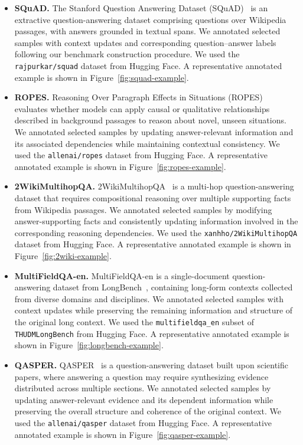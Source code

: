 \begin{itemize}

\item \textbf{SQuAD.}
The Stanford Question Answering Dataset (SQuAD)~\citep{rajpurkar2016squad} is an extractive question-answering dataset comprising questions over Wikipedia passages, with answers grounded in textual spans.
We annotated selected samples with context updates and corresponding question--answer labels following our benchmark construction procedure.
We used the \texttt{rajpurkar/squad} dataset from Hugging Face.
A representative annotated example is shown in Figure~\ref{fig:squad-example}.

\item \textbf{ROPES.}
Reasoning Over Paragraph Effects in Situations (ROPES)~\citep{lin2019reasoning} evaluates whether models can apply causal or qualitative relationships described in background passages to reason about novel, unseen situations.
We annotated selected samples by updating answer-relevant information and its associated dependencies while maintaining contextual consistency.
We used the \texttt{allenai/ropes} dataset from Hugging Face.
A representative annotated example is shown in Figure~\ref{fig:ropes-example}.

\item \textbf{2WikiMultihopQA.}
2WikiMultihopQA~\citep{ho2020constructing} is a multi-hop question-answering dataset that requires compositional reasoning over multiple supporting facts from Wikipedia passages.
We annotated selected samples by modifying answer-supporting facts and consistently updating information involved in the corresponding reasoning dependencies.
We used the \texttt{xanhho/2WikiMultihopQA} dataset from Hugging Face.
A representative annotated example is shown in Figure~\ref{fig:2wiki-example}.

\item \textbf{MultiFieldQA-en.}
MultiFieldQA-en is a single-document question-answering dataset from LongBench~\citep{bai2024longbench}, containing long-form contexts collected from diverse domains and disciplines.
We annotated selected samples with context updates while preserving the remaining information and structure of the original long context.
We used the \texttt{multifieldqa\_en} subset of \texttt{THUDM\/LongBench} from Hugging Face.
A representative annotated example is shown in Figure~\ref{fig:longbench-example}.

\item \textbf{QASPER.}
QASPER~\citep{dasigi2021dataset} is a question-answering dataset built upon scientific papers, where answering a question may require synthesizing evidence distributed across multiple sections.
We annotated selected samples by updating answer-relevant evidence and its dependent information while preserving the overall structure and coherence of the original context.
We used the \texttt{allenai/qasper} dataset from Hugging Face.
A representative annotated example is shown in Figure~\ref{fig:qasper-example}.


\end{itemize}
